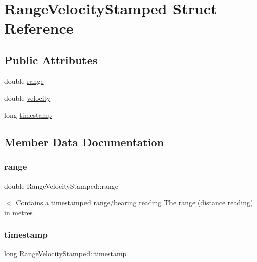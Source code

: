 \hypertarget{structRangeVelocityStamped}{}\section{Range\+Velocity\+Stamped Struct Reference}
\label{structRangeVelocityStamped}
\subsection*{Public Attributes}
\begin{DoxyCompactItemize}
\item 
double \hyperlink{structRangeVelocityStamped_ae635d3c25ade1a2f5c52f62442eb0bf9}{range}
\item 
double \hyperlink{structRangeVelocityStamped_a17777401a22b59317e92666f03f7fc88}{velocity}
\item 
long \hyperlink{structRangeVelocityStamped_a3fec5547c45ed9c80e69ff7e38d9ef99}{timestamp}
\end{DoxyCompactItemize}


\subsection{Member Data Documentation}
\mbox{\label{structRangeVelocityStamped_ae635d3c25ade1a2f5c52f62442eb0bf9}} 
\subsubsection{\texorpdfstring{range}{range}}
{\footnotesize\ttfamily double Range\+Velocity\+Stamped\+::range}

$<$ Contains a timestamped range/bearing reading The range (distance reading) in metres \mbox{\label{structRangeVelocityStamped_a3fec5547c45ed9c80e69ff7e38d9ef99}} 
\subsubsection{\texorpdfstring{timestamp}{timestamp}}
{\footnotesize\ttfamily long Range\+Velocity\+Stamped\+::timestamp}

